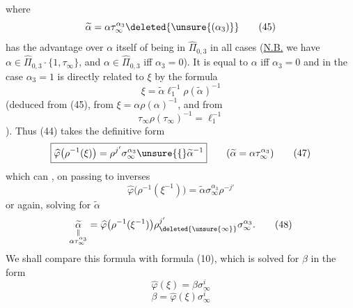 where 
\[
\widetilde\alpha=\alpha\tau_\infty^{\alpha_3}\deleted{\unsure{(\alpha_3)}}
\tag{45}
\]
has the advantage over $\alpha$ itself of being in $\widehat\Pi_{0,3}$ in all cases (\uline{N.B.} we have
$\alpha\in\widehat\Pi_{0,3}\cdot\{1,\tau_\infty\}$, and $\alpha\in\widehat\Pi_{0,3}$ iff $\alpha_3=0$).
It is equal to $\alpha$ iff $\alpha_3=0$ and in the case $\alpha_3=1$  is directly related to $\xi$ by the formula
\[
\xi=\widetilde\alpha\ell_1^{-1}\rho(\widetilde\alpha)^{-1}
\tag{46}
\]
(deduced from (45), from $\xi=\alpha\rho(\alpha)^{-1}$, and from
\[
\tau_\infty\rho(\tau_\infty)^{-1}=\ell_1^{-1}
\tag{**}
\]
).
Thus (44) takes the definitive form
\[
\boxed{\widehat{\varphi}\bigl(\rho^{-1}(\xi)\bigr)=\rho^{j'}\sigma_\infty^{\alpha_3}\unsure{\lbrace}\widetilde\alpha^{-1}}
\qquad(\widetilde\alpha=\alpha\tau_\infty^{\alpha_3})
\tag{47}
\]
which can  , on passing to inverses
\[
\widehat{\varphi}\bigl(\rho^{-1}(\xi^{-1})\bigr)=\widetilde\alpha\sigma_\infty^{\alpha_3}\rho^{-j'}
\tag{47 bis}
\]
or again, solving for $\widetilde\alpha$
\[
\underset{\substack{\Vert\\\alpha\tau_\infty^{\alpha_3}}}{\widetilde\alpha}
=\widehat{\varphi}\bigl(\rho^{-1}(\xi^{-1})\bigr)\rho_{\deleted{\unsure{\infty}}}^{j'}\sigma_\infty^{\alpha_3}.
\tag{48}
\]
We shall compare this formula with formula (10), which is solved for $\beta$ in the form
\[
\widehat{\varphi}(\xi)=\beta\sigma_\infty^i
\tag*{(49)=(10)}
\]
\[
\beta=\widehat{\varphi}(\xi)\sigma_\infty^i
\tag{50}
\]


